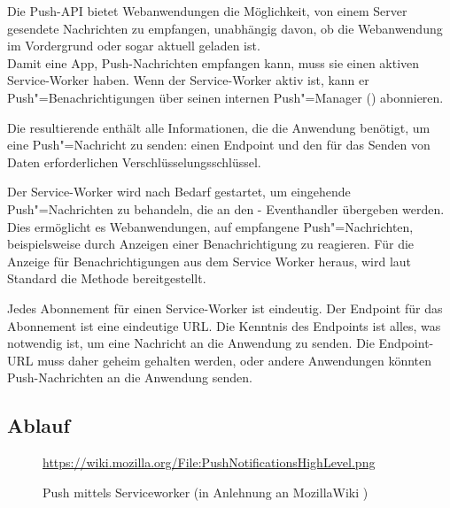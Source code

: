 Die Push-API bietet Webanwendungen die Möglichkeit, von einem Server gesendete Nachrichten zu empfangen, unabhängig davon, ob die Webanwendung im Vordergrund oder sogar aktuell geladen ist. \\
Damit eine App, Push-Nachrichten empfangen kann, muss sie einen aktiven Service-Worker haben. Wenn der Service-Worker aktiv ist, kann er Push"=Benachrichtigungen über seinen internen Push"=Manager () abonnieren.

Die resultierende  enthält alle Informationen, die die Anwendung benötigt, um eine Push"=Nachricht zu senden: einen Endpoint und den für das Senden von Daten erforderlichen Verschlüsselungsschlüssel.

Der Service-Worker wird nach Bedarf gestartet, um eingehende Push"=Nachrichten zu behandeln, die an den - Eventhandler übergeben werden. Dies ermöglicht es Webanwendungen, auf empfangene Push"=Nachrichten, beispielsweise durch Anzeigen einer Benachrichtigung zu reagieren. Für die Anzeige für Benachrichtigungen aus dem Service Worker heraus, wird laut Standard die Methode  bereitgestellt.

Jedes Abonnement für einen Service-Worker ist eindeutig. Der Endpoint für das Abonnement ist eine eindeutige URL. Die Kenntnis des Endpoints ist alles, was notwendig ist, um eine Nachricht an die Anwendung zu senden. Die Endpoint-URL muss daher geheim gehalten werden, oder andere Anwendungen könnten Push-Nachrichten an die Anwendung senden.

\subsection{Ablauf}

\begin{figure}[htp] 
\caption{Push mittels Serviceworker (in Anlehnung an MozillaWiki \cite{MOZ_WIKI})}
\quelle\url{https://wiki.mozilla.org/File:PushNotificationsHighLevel.png}
\label{image_architektur-serviceworker-push}
\end{figure} 

